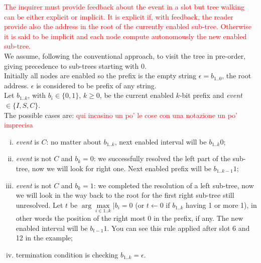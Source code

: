 \documentclass[12pt,a4paper]{report}
\begin{document}
\textcolor{red}{
The inquirer must provide feedback about the event in a slot but tree walking can be either explicit or implicit. It is explicit if, with feedback, the reader provide also the address in the root of the currently enabled sub-tree. Otherwise it is said to be implicit and each node compute autonomously the new enabled sub-tree.}\\
We assume, following the conventional approach, to visit the tree in pre-order, giving precedence to sub-trees starting with 0.\\
Initially all nodes are enabled so the prefix is the empty string $\epsilon=b_{1..0}$, the root address. $\epsilon$ is considered to be prefix of any string.\\
Let $b_{1..k}$, with $b_{i} \in \{0,1\}$, $k \geq0$, be the current enabled $k$-bit prefix and \emph{event} $\in \{I,S,C\}$.\\
The possible cases are: \textcolor{red}{qui incasino un po' le cose con una notazione un po' imprecisa}
\begin{enumerate}[i.]
\item \emph{event} is $C$: no matter about $b_{1..k}$, next enabled interval will be $b_{1..k}0$;
\item \emph{event} is not $C$ and $b_{k}=0$: we successfully resolved the left part of the sub-tree, now we will look for right one. Next enabled prefix will be $b_{1..k-1}1$;
\item \emph{event} is not $C$ and $b_{k}=1$: we completed the  resolution of a left sub-tree, now we will look in the way back to the root for the first right sub-tree still unresolved. Let $t$ be $ \arg\underset{i \in 1..k}{\max}|b_{i}=0$ (or $t\gets 0$ if $b_{1..k}$ having 1 or more 1), in other words the position of the right most 0 in the prefix, if any. The new enabled interval will be $b_{t-1}1$. You can see this rule applied after slot 6 and 12 in the example;
\item termination condition is checking $b_{1..k}=\epsilon$.
\end{enumerate}
\end{document}
